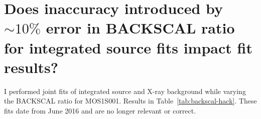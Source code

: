 \documentclass[preprint2,tighten,trackchanges]{aastex6}
\newcommand*{\abt}{\mathord{\sim}} %
\begin{document}
\begin{figure*}[!hb]
    \label{fig:nonthermal}
\end{figure*}


\clearpage
\section{Does inaccuracy introduced by $\abt 10\%$ error in BACKSCAL ratio for
integrated source fits impact fit results?}

I performed joint fits of integrated source and X-ray background while
varying the BACKSCAL ratio for MOS1S001.
Results in Table~\ref{tab:backscal-hack}.
These fits date from June 2016 and are no longer relevant or correct.
\end{document}

